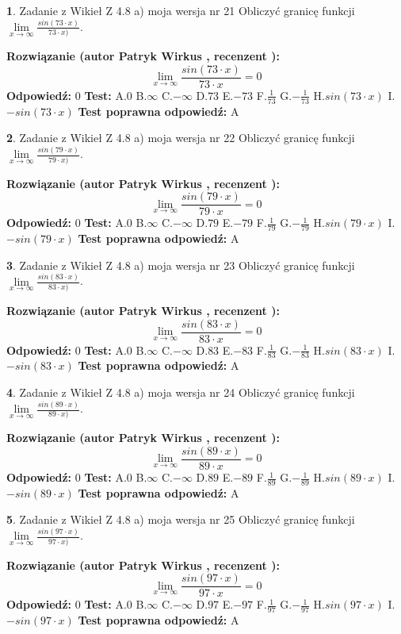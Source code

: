 \documentclass[12pt, a4paper]{article}
\theoremstyle{definition} %
\newtheorem{zad}{}
\newcommand{\zadStart}[1]{\begin{zad}#1\newline}
\newcommand{\zadStop}{\end{zad}}
\newcommand{\rozwStart}[2]{\noindent \textbf{Rozwiązanie (autor #1 , recenzent #2): }\newline}
\newcommand{\rozwStop}{\newline}
\newcommand{\odpStart}{\noindent \textbf{Odpowiedź:}\newline}
\newcommand{\odpStop}{\newline}
\newcommand{\testStart}{\noindent \textbf{Test:}\newline}
\newcommand{\testStop}{\newline}
\newcommand{\kluczStart}{\noindent \textbf{Test poprawna odpowiedź:}\newline}
\newcommand{\kluczStop}{\newline}
\begin{document}
\zadStart{Zadanie z Wikieł Z 4.8 a) moja wersja nr 21}
Obliczyć granicę funkcji $\lim\limits_{x\to \infty}\frac{sin(73\cdot x)}{73\cdot x)}$.
\zadStop
\rozwStart{Patryk Wirkus}{}
$$\lim\limits_{x\to \infty}\frac{sin(73\cdot x)}{73\cdot x}=
0$$
\rozwStop
\odpStart
$0$
\odpStop
\testStart
A.$0$ B.$\infty$ C.$-\infty$ D.$73$ E.$-73$
F.$\frac{1}{73}$ G.$-\frac{1}{73}$
H.$sin(73\cdot x)$
I.$-sin(73\cdot x)$
\testStop
\kluczStart
A
\kluczStop



\zadStart{Zadanie z Wikieł Z 4.8 a) moja wersja nr 22}
Obliczyć granicę funkcji $\lim\limits_{x\to \infty}\frac{sin(79\cdot x)}{79\cdot x)}$.
\zadStop
\rozwStart{Patryk Wirkus}{}
$$\lim\limits_{x\to \infty}\frac{sin(79\cdot x)}{79\cdot x}=
0$$
\rozwStop
\odpStart
$0$
\odpStop
\testStart
A.$0$ B.$\infty$ C.$-\infty$ D.$79$ E.$-79$
F.$\frac{1}{79}$ G.$-\frac{1}{79}$
H.$sin(79\cdot x)$
I.$-sin(79\cdot x)$
\testStop
\kluczStart
A
\kluczStop



\zadStart{Zadanie z Wikieł Z 4.8 a) moja wersja nr 23}
Obliczyć granicę funkcji $\lim\limits_{x\to \infty}\frac{sin(83\cdot x)}{83\cdot x)}$.
\zadStop
\rozwStart{Patryk Wirkus}{}
$$\lim\limits_{x\to \infty}\frac{sin(83\cdot x)}{83\cdot x}=
0$$
\rozwStop
\odpStart
$0$
\odpStop
\testStart
A.$0$ B.$\infty$ C.$-\infty$ D.$83$ E.$-83$
F.$\frac{1}{83}$ G.$-\frac{1}{83}$
H.$sin(83\cdot x)$
I.$-sin(83\cdot x)$
\testStop
\kluczStart
A
\kluczStop



\zadStart{Zadanie z Wikieł Z 4.8 a) moja wersja nr 24}
Obliczyć granicę funkcji $\lim\limits_{x\to \infty}\frac{sin(89\cdot x)}{89\cdot x)}$.
\zadStop
\rozwStart{Patryk Wirkus}{}
$$\lim\limits_{x\to \infty}\frac{sin(89\cdot x)}{89\cdot x}=
0$$
\rozwStop
\odpStart
$0$
\odpStop
\testStart
A.$0$ B.$\infty$ C.$-\infty$ D.$89$ E.$-89$
F.$\frac{1}{89}$ G.$-\frac{1}{89}$
H.$sin(89\cdot x)$
I.$-sin(89\cdot x)$
\testStop
\kluczStart
A
\kluczStop



\zadStart{Zadanie z Wikieł Z 4.8 a) moja wersja nr 25}
Obliczyć granicę funkcji $\lim\limits_{x\to \infty}\frac{sin(97\cdot x)}{97\cdot x)}$.
\zadStop
\rozwStart{Patryk Wirkus}{}
$$\lim\limits_{x\to \infty}\frac{sin(97\cdot x)}{97\cdot x}=
0$$
\rozwStop
\odpStart
$0$
\odpStop
\testStart
A.$0$ B.$\infty$ C.$-\infty$ D.$97$ E.$-97$
F.$\frac{1}{97}$ G.$-\frac{1}{97}$
H.$sin(97\cdot x)$
I.$-sin(97\cdot x)$
\testStop
\kluczStart
A
\kluczStop
\end{document}
